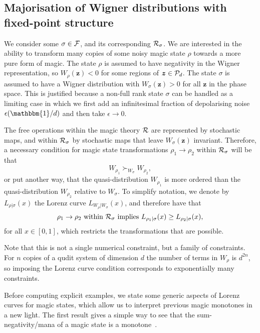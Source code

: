 \documentclass[
onecolumn,
superscriptaddress
]{revtex4-1}
\def\id{\mathbbm{1}}
\def\z{\boldsymbol{z}}
\def\R{{\cal R}}
\def\F{{\cal F}}
\renewcommand{\P}{{\cal P}}
\begin{document}
\subsection*{Majorisation of Wigner distributions with fixed-point structure}

We consider some $\sigma \in \F$, and its corresponding $\R_\sigma$. We are interested in the ability to transform many copies of some noisy magic state $\rho$ towards a more pure form of magic. The state $\rho$ is assumed to have negativity in the Wigner representation, so $W_\rho(\z) < 0$ for some regions of $\z \in \P_d$. The state $\sigma$ is assumed to have a Wigner distribution with $W_\sigma(\z) > 0$ for all $\z$ in the phase space.
This is justified because a non-full rank state $\sigma$ can be handled as a limiting case in which we first add an infinitesimal fraction of depolarising noise $\epsilon (\id/d)$ and then take $\epsilon \rightarrow 0$.

The free operations within the magic theory $\R$ are represented by stochastic maps, and within $\R_\sigma$ by stochastic maps that leave $W_\sigma(\z)$ invariant. Therefore, a necessary condition for magic state transformations $\rho_1 \rightarrow \rho_2$ within $\R_\sigma$ will be that 
\begin{equation}
	W_{\rho_1} \succ_{W_{\sigma}} W_{\rho_2},
\end{equation}
or put another way, that the quasi-distribution $W_{\rho_1}$ is more ordered than the quasi-distribution $W_{\rho_2}$ relative to $W_\sigma$. To simplify notation, we denote by $L_{\rho | \sigma}(x)$ the Lorenz curve $L_{W_{\rho} | W_{\sigma}} (x)$, and therefore have that
\begin{equation}
\rho_1 \rightarrow \rho_2 \mbox{ within }\R_\sigma \mbox{ implies } L_{\rho_1 |\sigma} (x) \ge L_{\rho_2 |\sigma} (x),
\end{equation}
for all $x \in [0,1]$, which restricts the transformations that are possible.

Note that this is not a single numerical constraint, but a family of constraints. For $n$ copies of a qudit system of dimension $d$ the number of terms in $W_{\rho}$ is $d^{2n}$, so imposing the Lorenz curve condition corresponds to exponentially many constraints.

Before computing explicit examples, we state some generic aspects of Lorenz curves for magic states, which allow us to interpret previous magic monotones in a new light. The first result gives a simple way to see that the sum-negativity/mana of a magic state is a monotone~\cite{cit:veitch2}.
\end{document}
